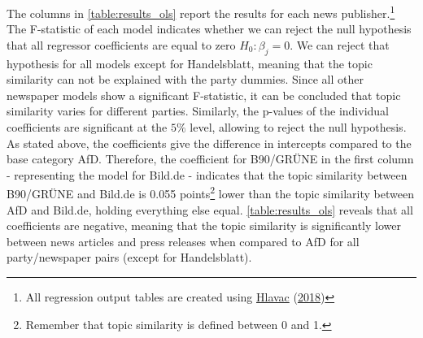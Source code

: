\documentclass[
  12pt,
]{article}
\begin{document}
The columns in \autoref{table:results_ols} report the results for each
news publisher.\footnote{All regression output tables are created using
  \protect\hyperlink{ref-hlavac_stargazer_2018}{Hlavac}
  (\protect\hyperlink{ref-hlavac_stargazer_2018}{2018})} The F-statistic
of each model indicates whether we can reject the null hypothesis that
all regressor coefficients are equal to zero \(H_0: \beta_j=0\). We can
reject that hypothesis for all models except for Handelsblatt, meaning
that the topic similarity can not be explained with the party dummies.
Since all other newspaper models show a significant F-statistic, it can
be concluded that topic similarity varies for different parties.
Similarly, the p-values of the individual coefficients are significant
at the \(5\%\) level, allowing to reject the null hypothesis. As stated
above, the coefficients give the difference in intercepts compared to
the base category AfD. Therefore, the coefficient for B90/GRÜNE in the
first column - representing the model for Bild.de - indicates that the
topic similarity between B90/GRÜNE and Bild.de is 0.055
points\footnote{Remember that topic similarity is defined between 0 and
  1.} lower than the topic similarity between AfD and Bild.de, holding
everything else equal. \autoref{table:results_ols} reveals that all
coefficients are negative, meaning that the topic similarity is
significantly lower between news articles and press releases when
compared to AfD for all party/newspaper pairs (except for Handelsblatt).
\end{document}
